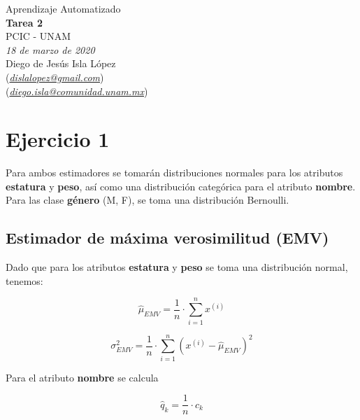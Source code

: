 \documentclass[letterpaper,12pt]{article}
\theoremstyle{definition}
\begin{document}
\begin{center}
  {\large Aprendizaje Automatizado}\\
  \vspace{0.2cm}
  {\large\bfseries Tarea 2}\\
  \vspace{0.2cm}
  {\large PCIC - UNAM}\\
  \vspace{0.5cm}
  {\itshape 18 de marzo de 2020}\\
  \vspace{0.5cm}
  Diego de Jesús Isla López\\
  (\href{mailto:dislalopez@gmail.com}{\itshape dislalopez@gmail.com})\\
  (\href{mailto:diego.isla@comunidad.unam.mx}{\itshape diego.isla@comunidad.unam.mx})\\
\end{center}


\section*{Ejercicio 1}

Para ambos estimadores se tomarán distribuciones normales para los atributos \textbf{estatura} y \textbf{peso}, así como una distribución categórica para el atributo \textbf{nombre}. Para las clase \textbf{género} (M, F), se toma una distribución Bernoulli.\\


\subsection*{Estimador de máxima verosimilitud (EMV)}

Dado que para los atributos \textbf{estatura} y \textbf{peso} se toma una distribución normal, tenemos:

\begin{equation}
  \hat{\mu}_{EMV} = \frac{1}{n} \cdot \sum_{i=1}^n x^{(i)}
\end{equation}

\begin{equation}
  \sigma^2_{EMV} = \frac{1}{n} \cdot \sum_{i=1}^n (x^{(i)} - \hat{\mu}_{EMV})^2
\end{equation}

Para el atributo \textbf{nombre} se calcula 

\begin{equation}
  \hat{q}_k = \frac{1}{n} \cdot c_k
\end{equation}
\end{document}
